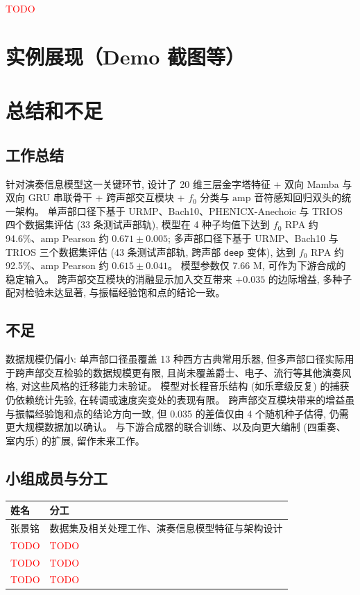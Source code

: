 \documentclass[a4paper, UTF8, zihao=-4, fontset=fandol]{ctexart}
\begin{document}
\textcolor{red}{TODO}

\section{实例展现（Demo 截图等）}

\section{总结和不足}

\subsection{工作总结}

针对演奏信息模型这一关键环节, 设计了 20 维三层金字塔特征 + 双向 Mamba 与双向 GRU 串联骨干 + 跨声部交互模块 + $f_0$ 分类与 $\mathrm{amp}$ 音符感知回归双头的统一架构。 单声部口径下基于 URMP、Bach10、PHENICX-Anechoic 与 TRIOS 四个数据集评估 (33 条测试声部轨), 模型在 4 种子均值下达到 $f_0$ RPA 约 94.6\%、$\mathrm{amp}$ Pearson 约 $0.671 \pm 0.005$; 多声部口径下基于 URMP、Bach10 与 TRIOS 三个数据集评估 (43 条测试声部轨, 跨声部 \texttt{deep} 变体), 达到 $f_0$ RPA 约 92.5\%、$\mathrm{amp}$ Pearson 约 $0.615 \pm 0.041$。 模型参数仅 7.66 M, 可作为下游合成的稳定输入。 跨声部交互模块的消融显示加入交互带来 $+0.035$ 的边际增益, 多种子配对检验未达显著, 与振幅经验饱和点的结论一致。

\subsection{不足}

数据规模仍偏小: 单声部口径虽覆盖 13 种西方古典常用乐器, 但多声部口径实际用于跨声部交互检验的数据规模更有限, 且尚未覆盖爵士、电子、流行等其他演奏风格, 对这些风格的迁移能力未验证。 模型对长程音乐结构 (如乐章级反复) 的捕获仍依赖统计先验, 在转调或速度突变处的表现有限。 跨声部交互模块带来的增益虽与振幅经验饱和点的结论方向一致, 但 0.035 的差值仅由 4 个随机种子估得, 仍需更大规模数据加以确认。 与下游合成器的联合训练、以及向更大编制 (四重奏、室内乐) 的扩展, 留作未来工作。

\subsection{小组成员与分工}

\begin{table}[H]
\centering
\begin{tabular}{ll}
\toprule
姓名 & 分工 \\
\midrule
张景铭 & 数据集及相关处理工作、演奏信息模型特征与架构设计 \\
\textcolor{red}{TODO} & \textcolor{red}{TODO} \\
\textcolor{red}{TODO} & \textcolor{red}{TODO} \\
\textcolor{red}{TODO} & \textcolor{red}{TODO} \\
\bottomrule
\end{tabular}
\end{table}
\end{document}
